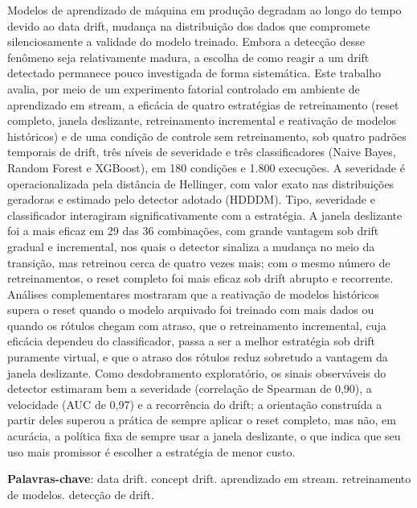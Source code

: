 \begin{resumo}
Modelos de aprendizado de máquina em produção degradam ao longo do tempo
devido ao data drift, mudança na distribuição dos dados que compromete
silenciosamente a validade do modelo treinado. Embora a detecção desse
fenômeno seja relativamente madura, a escolha de como reagir a um drift
detectado permanece pouco investigada de forma sistemática. Este trabalho
avalia, por meio de um experimento fatorial controlado em ambiente de
aprendizado em stream, a eficácia de quatro estratégias de retreinamento
(reset completo, janela deslizante, retreinamento incremental e reativação
de modelos históricos) e de uma condição de controle sem retreinamento, sob
quatro padrões temporais de drift, três níveis de severidade e três
classificadores (Naive Bayes, Random Forest e XGBoost), em 180 condições e
1.800 execuções. A severidade é operacionalizada pela distância de
Hellinger, com valor exato nas distribuições geradoras e estimado pelo
detector adotado (HDDDM). Tipo, severidade e classificador interagiram
significativamente com a estratégia. A janela deslizante foi a mais eficaz
em 29 das 36 combinações, com grande vantagem sob drift gradual e
incremental, nos quais o detector sinaliza a mudança no meio da transição,
mas retreinou cerca de quatro vezes mais; com o mesmo número de
retreinamentos, o reset completo foi mais eficaz sob drift abrupto e
recorrente. Análises complementares mostraram que a reativação de modelos
históricos supera o reset quando o modelo arquivado foi treinado com mais
dados ou quando os rótulos chegam com atraso, que o retreinamento
incremental, cuja eficácia dependeu do classificador, passa a ser a melhor
estratégia sob drift puramente virtual, e que o atraso dos rótulos reduz
sobretudo a vantagem da janela deslizante.
Como desdobramento exploratório, os sinais observáveis do detector
estimaram bem a severidade (correlação de Spearman de 0,90), a velocidade
(AUC de 0,97) e a recorrência do drift; a orientação construída a partir
deles superou a prática de sempre aplicar o reset completo, mas não, em
acurácia, a política fixa de sempre usar a janela deslizante, o que indica
que seu uso mais promissor é escolher a estratégia de menor custo.
\vspace{\onelineskip}
    
\noindent \textbf{Palavras-chave}: data drift. concept drift. aprendizado em
stream. retreinamento de modelos. detecção de drift.
\end{resumo}
